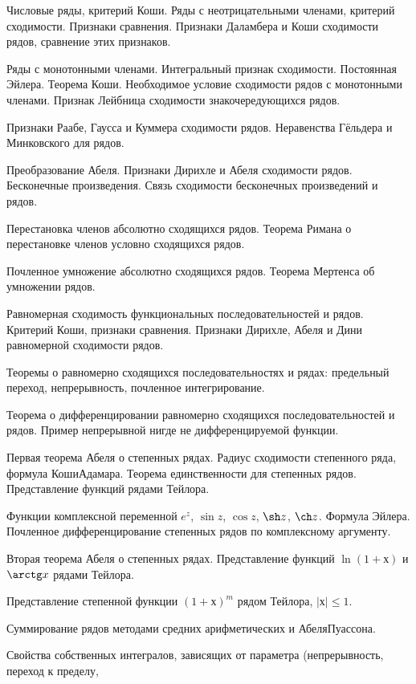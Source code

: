\documentclass[a4paper]{article}
\begin{document}
\begin{nums}{-3}
\item Числовые ряды, критерий Коши. Ряды с неотрицательными членами, критерий сходимости. Признаки
сравнения. Признаки Даламбера и Коши сходимости рядов, сравнение этих признаков.
\item Ряды с монотонными членами. Интегральный признак сходимости. Постоянная Эйлера. Теорема Коши.
Необходимое условие сходимости рядов с монотонными членами. Признак Лейбница сходимости знакочередующихся рядов.
\item Признаки Раабе, Гаусса и Куммера сходимости рядов. Неравенства Гёльдера и Минковского для рядов.
\item Преобразование Абеля. Признаки Дирихле и Абеля сходимости рядов. Бесконечные произведения. Связь
сходимости бесконечных произведений и рядов.
\item Перестановка членов абсолютно сходящихся рядов. Теорема Римана о перестановке членов условно сходящихся рядов.
\item Почленное умножение абсолютно сходящихся рядов. Теорема Мертенса об умножении рядов.
\item Равномерная сходимость функциональных последовательностей и рядов. Критерий Коши, признаки сравнения.
Признаки Дирихле, Абеля и Дини равномерной сходимости рядов.
\item Теоремы о равномерно сходящихся последовательностях и рядах: предельный переход, непрерывность,
почленное интегрирование.
\item Теорема о дифференцировании равномерно сходящихся последовательностей и рядов. Пример непрерывной
нигде не дифференцируемой функции.
\item Первая теорема Абеля о степенных рядах. Радиус сходимости степенного  ряда, формула Коши\ч Адамара.
Теорема единственности для степенных рядов. Представление функций рядами Тейлора.
\item Функции комплексной переменной $e^z$, $\sin z$, $\cos z$, $\sh z$, $\ch z$. Формула Эйлера.
Почленное дифференцирование степенных рядов по комплексному аргументу.
\item Вторая теорема Абеля о степенных рядах.  Представление функций $\ln(1 + х)$ и $\arctg x$ рядами Тейлора.
\item Представление степенной функции $(1 + х)^m$ рядом Тейлора, $|х| \le 1$.
\item Суммирование рядов методами средних арифметических и Абеля\ч Пуассона.
\item Свойства собственных интегралов, зависящих от параметра (непрерывность, переход к пределу,

\end{nums}
\end{document}
